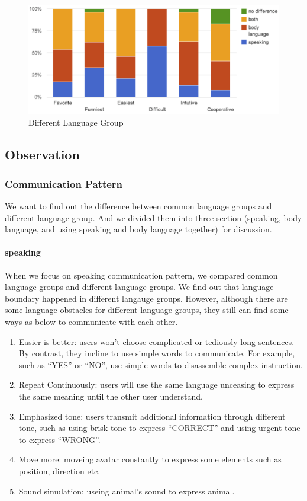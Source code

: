 \begin{figure}[!h]
\centering
\includegraphics[width=0.9\columnwidth]{Figures/US_FQ_Dif.png}
\caption{Different Language Group}
\label{fig:US_FQ_Dif}
\end{figure}



\subsection{Observation}
\subsubsection{Communication Pattern}
We want to find out the difference between common language groups and different language group. And we divided them into three section (speaking, body language, and using speaking and body language together) for discussion.

\paragraph{speaking}
When we focus on speaking communication pattern, we compared common language groups and different language groups. We find out that language boundary happened in different langauge groups. However, although there are some language obstacles for different language groups, they still can find some ways as below to communicate with each other.

\begin{enumerate}
  \item Easier is better: users won't choose complicated or tediously long sentences. By contrast, they incline to use simple words to communicate. For example, such as ``YES'' or ``NO'', use simple words to disassemble complex instruction.

  \item Repeat Continuously: users will use the same language unceasing to express the same meaning until the other user understand.
  
  \item Emphasized tone: users transmit additional information through different tone, such as using brisk tone to express ``CORRECT'' and using urgent tone to express ``WRONG''.
  
  \item Move more: moveing avatar constantly to express some elements such as position, direction etc.
  
  \item Sound simulation: useing animal's sound to express animal.
\end{enumerate}

